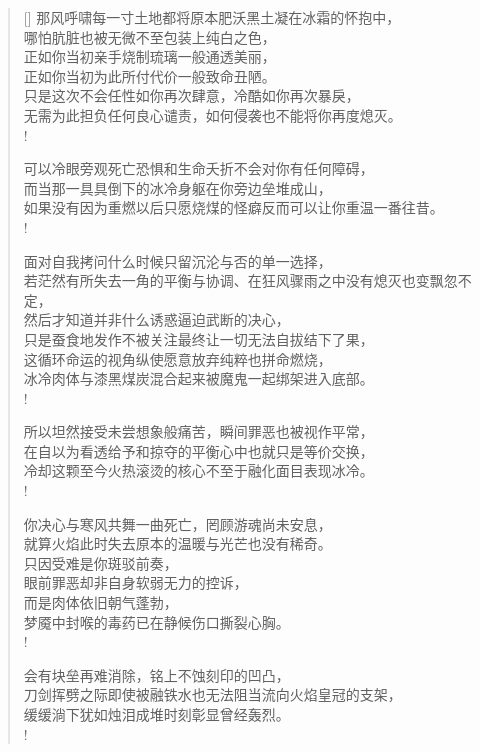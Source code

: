 \documentclass[UTF8, 12pt, a4paper]{ctexrep} %
\begin{document}
\begin{verse}[\versewidth]
那风呼啸每一寸土地都将原本肥沃黑土凝在冰霜的怀抱中，\\
哪怕肮脏也被无微不至包装上纯白之色，\\
正如你当初亲手烧制琉璃一般通透美丽，\\
正如你当初为此所付代价一般致命丑陋。\\
只是这次不会任性如你再次肆意，冷酷如你再次暴戾，\\
无需为此担负任何良心谴责，如何侵袭也不能将你再度熄灭。\\!

可以冷眼旁观死亡恐惧和生命夭折不会对你有任何障碍，\\
而当那一具具倒下的冰冷身躯在你旁边垒堆成山，\\
如果没有因为重燃以后只愿烧煤的怪癖反而可以让你重温一番往昔。\\!

面对自我拷问什么时候只留沉沦与否的单一选择，\\
若茫然有所失去一角的平衡与协调、在狂风骤雨之中没有熄灭也变飘忽不定，\\
然后才知道并非什么诱惑逼迫武断的决心，\\
只是蚕食地发作不被关注最终让一切无法自拔结下了果，\\
这循环命运的视角纵使愿意放弃纯粹也拼命燃烧，\\
冰冷肉体与漆黑煤炭混合起来被魔鬼一起绑架进入底部。\\!

所以坦然接受未尝想象般痛苦，瞬间罪恶也被视作平常，\\
在自以为看透给予和掠夺的平衡心中也就只是等价交换，\\
冷却这颗至今火热滚烫的核心不至于融化面目表现冰冷。\\!

你决心与寒风共舞一曲死亡，罔顾游魂尚未安息，\\
就算火焰此时失去原本的温暖与光芒也没有稀奇。\\
只因受难是你斑驳前奏，\\
眼前罪恶却非自身软弱无力的控诉，\\
而是肉体依旧朝气蓬勃，\\
梦魇中封喉的毒药已在静候伤口撕裂心胸。\\!

会有块垒再难消除，铭上不蚀刻印的凹凸，\\
刀剑挥劈之际即使被融铁水也无法阻当流向火焰皇冠的支架，\\
缓缓淌下犹如烛泪成堆时刻彰显曾经轰烈。\\!


\end{verse}
\end{document}
